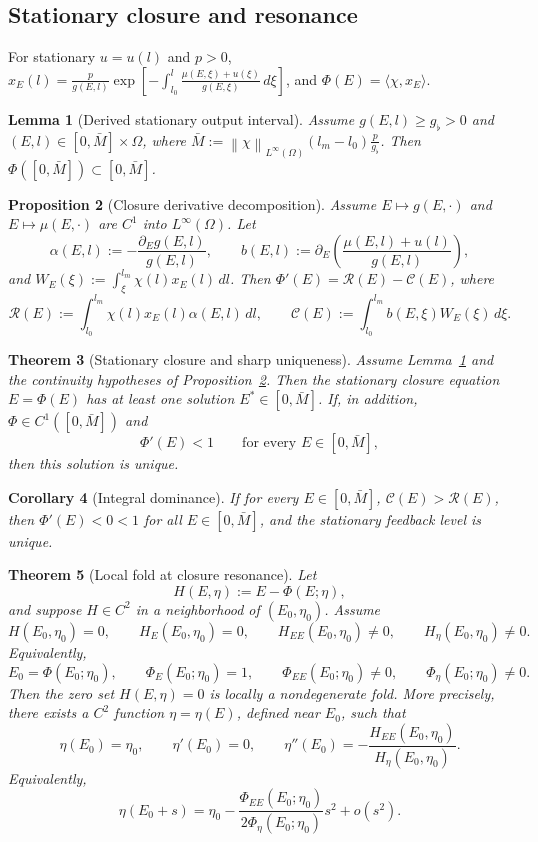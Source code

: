 \documentclass[pdflatex,sn-mathphys-num]{sn-jnl}
\theoremstyle{thmstyleone}
\newtheorem{theorem}{Theorem}[section]
\newtheorem{proposition}[theorem]{Proposition}
\newtheorem{lemma}[theorem]{Lemma}
\newtheorem{corollary}[theorem]{Corollary}
\theoremstyle{definition}
\theoremstyle{remark}
\newcommand{\Om}{\Omega}
\newcommand{\Rcal}{\mathcal{R}}
\newcommand{\Ccal}{\mathcal{C}}
\newcommand{\norm}[1]{\left\lVert#1\right\rVert}
\numberwithin{equation}{section}
\begin{document}
\subsection{Stationary closure and resonance}
\label{subsec:main-stationary}
For stationary \(u=u(l)\) and \(p>0\),
$\displaystyle 
x_E(l)=
\frac{p}{g(E,l)}
\exp\!\left[
-\int_{l_0}^{l}
\frac{\mu(E,\xi)+u(\xi)}{g(E,\xi)}\,d\xi
\right]$, and
$\Phi(E)=\langle\chi,x_E\rangle$.
\begin{lemma}[Derived stationary output interval]
\label{lem:main-stationary-box}
Assume
$g(E,l)\ge g_\flat>0$ and
$(E,l)\in[0,\bar M]\times\Om$,
where
$\displaystyle 
\bar M:=
\norm{\chi}_{L^\infty(\Om)}
(l_m-l_0)\frac{p}{g_\flat}$.
Then
$\displaystyle 
\Phi([0,\bar M])\subset[0,\bar M]$.
\end{lemma}
\begin{proposition}[Closure derivative decomposition]
\label{prop:main-decomp}
Assume \(E\mapsto g(E,\cdot)\) and \(E\mapsto\mu(E,\cdot)\) are \(C^1\) into
\(L^\infty(\Om)\). Let
\[
\alpha(E,l):=-\frac{\partial_E g(E,l)}{g(E,l)},
\qquad
b(E,l):=\partial_E\left(\frac{\mu(E,l)+u(l)}{g(E,l)}\right),
\]
and
$\displaystyle 
W_E(\xi):=\int_\xi^{l_m}\chi(l)x_E(l)\,dl$.
Then
$\displaystyle 
\Phi'(E)=\Rcal(E)-\Ccal(E)$,
where
\[
\Rcal(E):=
\int_{l_0}^{l_m}\chi(l)x_E(l)\alpha(E,l)\,dl,
\qquad
\Ccal(E):=
\int_{l_0}^{l_m}b(E,\xi)W_E(\xi)\,d\xi .
\]
\end{proposition}

\begin{theorem}[Stationary closure and sharp uniqueness]
\label{thm:main-stationary}
Assume Lemma~\ref{lem:main-stationary-box} and the continuity hypotheses of
Proposition~\ref{prop:main-decomp}. Then the stationary closure equation
$E=\Phi(E)$
has at least one solution \(E^*\in[0,\bar M]\). If, in addition,
\(\Phi\in C^1([0,\bar M])\) and
\[
\Phi'(E)<1
\qquad \text{for every }E\in[0,\bar M],
\]
then this solution is unique.
\end{theorem}
\begin{corollary}[Integral dominance]
\label{cor:main-dominance}
If for every $E\in[0,\bar M]$,
$\Ccal(E)>\Rcal(E)$,
then $\Phi'(E)<0<1$ for all $E\in[0,\bar M]$,
and the stationary feedback level is unique.
\end{corollary}

\begin{theorem}[Local fold at closure resonance]
\label{thm:main-fold}
Let
\[
H(E,\eta):=E-\Phi(E;\eta),
\]
and suppose \(H\in C^2\) in a neighborhood of \((E_0,\eta_0)\). Assume
\[
H(E_0,\eta_0)=0,
\qquad
H_E(E_0,\eta_0)=0,
\qquad
H_{EE}(E_0,\eta_0)\ne0,
\qquad
H_\eta(E_0,\eta_0)\ne0 .
\]
Equivalently,
\[
E_0=\Phi(E_0;\eta_0),
\qquad
\Phi_E(E_0;\eta_0)=1,
\qquad
\Phi_{EE}(E_0;\eta_0)\ne0,
\qquad
\Phi_\eta(E_0;\eta_0)\ne0 .
\]
Then the zero set \(H(E,\eta)=0\) is locally a nondegenerate fold. More
precisely, there exists a \(C^2\) function \(\eta=\eta(E)\), defined near
\(E_0\), such that
\[
\eta(E_0)=\eta_0,
\qquad
\eta'(E_0)=0,
\qquad
\eta''(E_0)
=
-\frac{H_{EE}(E_0,\eta_0)}{H_\eta(E_0,\eta_0)} .
\]
Equivalently,
\[
\eta(E_0+s)
=
\eta_0
-
\frac{\Phi_{EE}(E_0;\eta_0)}
     {2\Phi_\eta(E_0;\eta_0)}
s^2
+
o(s^2).
\]
\end{theorem}
\end{document}
